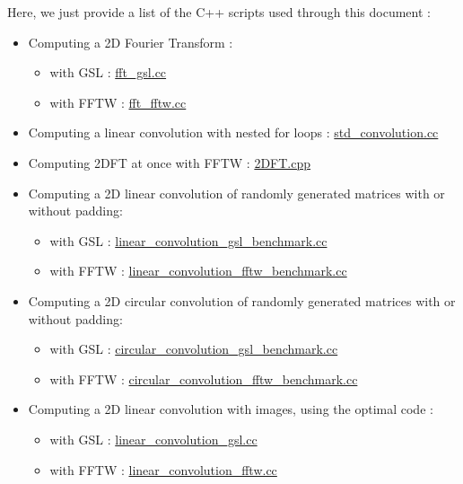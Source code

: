 \documentclass[a4paper,10pt,twoside]{article}
\begin{document}
Here, we just provide a list of the C++ scripts used through this document :
\begin{itemize}
\item Computing a 2D Fourier Transform :
\begin{itemize}
\item with GSL : \href{http://jeremy.fix.Free.Fr/Software/Convolution/fft_gsl.cc}{fft\_gsl.cc}
\item with FFTW : \href{http://jeremy.fix.Free.Fr/Software/Convolution/fft_fftw.cc}{fft\_fftw.cc}
\end{itemize}
\item  Computing a linear convolution with nested for loops : \href{http://jeremy.fix.Free.Fr/Software/Convolution/std_convolution.cc}{std\_convolution.cc}
\item  Computing 2DFT at once with FFTW : \href{http://jeremy.fix.Free.Fr/Software/Convolution/2DFT.cpp}{2DFT.cpp}
\item  Computing a 2D linear convolution of randomly generated matrices with or without padding:
\begin{itemize}
\item with GSL : \href{http://jeremy.fix.Free.Fr/Software/Convolution/linear_convolution_gsl_benchmark.cc}{linear\_convolution\_gsl\_benchmark.cc}
\item with FFTW : \href{http://jeremy.fix.Free.Fr/Software/Convolution/linear_convolution_fftw_benchmark.cc}{linear\_convolution\_fftw\_benchmark.cc}
\end{itemize}
\item  Computing a 2D circular convolution of randomly generated matrices with or without padding:
\begin{itemize}
\item with GSL : \href{http://jeremy.fix.Free.Fr/Software/Convolution/circular_convolution_gsl_benchmark.cc}{circular\_convolution\_gsl\_benchmark.cc}
\item with FFTW : \href{http://jeremy.fix.Free.Fr/Software/Convolution/circular_convolution_fftw_benchmark.cc}{circular\_convolution\_fftw\_benchmark.cc}
\end{itemize}
\item  Computing a 2D linear convolution with images, using the optimal code :
\begin{itemize}
\item with GSL : \href{http://jeremy.fix.Free.Fr/Software/Convolution/linear_convolution_gsl.cc}{linear\_convolution\_gsl.cc}
\item with FFTW : \href{http://jeremy.fix.Free.Fr/Software/Convolution/linear_convolution_fftw.cc}{linear\_convolution\_fftw.cc}

\end{itemize}
\end{itemize}
\end{document}
